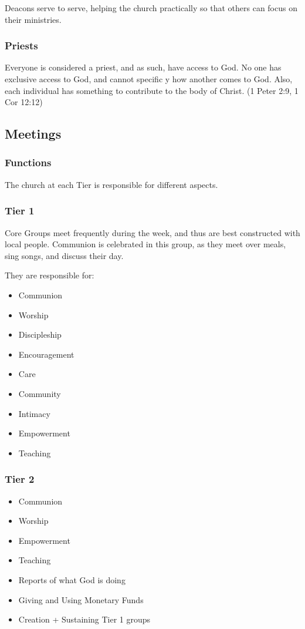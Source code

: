 \documentclass[CSHFoundation.tex]{subfiles}
\begin{document}
Deacons serve to serve, helping the church practically so that others can focus on their ministries.



\subsubsection{Priests}

Everyone is considered a priest, and as such, have access to God. No one has exclusive access to God, and cannot specific y how another comes to God. Also, each individual has something to contribute to the body of Christ. (1 Peter 2:9, 1 Cor 12:12)


\subsection{Meetings}

\subsubsection{Functions}

The church at each Tier is responsible for different aspects.

\subsubsection{Tier 1}

Core Groups meet frequently during the week, and thus are best constructed with local people. Communion is celebrated in this group, as they meet over meals, sing songs, and discuss their day.

They are responsible for:

\begin{itemize}
\item Communion
\item Worship
\item Discipleship
\item Encouragement
\item Care
\item Community
\item Intimacy
\item Empowerment
\item Teaching
\end{itemize}

\subsubsection{Tier 2}
\begin{itemize}
\item Communion
\item Worship
\item Empowerment
\item Teaching
\item Reports of what God is doing
\item Giving and Using Monetary Funds
\item Creation + Sustaining Tier 1 groups
\end{itemize}
\end{document}
